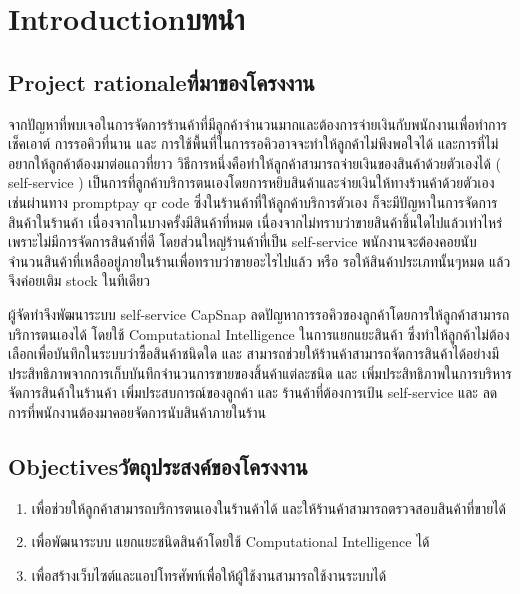 \chapter{\ifenglish Introduction\else บทนำ\fi}

\section{\ifenglish Project rationale\else ที่มาของโครงงาน\fi}
จากปัญหาที่พบเจอในการจัดการร้านค้าที่มีลูกค้าจำนวนมากและต้องการจ่ายเงินกับพนักงานเพื่อทำการเช็คเอาต์ การรอคิวที่นาน และ การใช้พื้นที่ในการรอคิวอาจจะทำให้ลูกค้าไม่พึงพอใจได้
และการที่ไม่อยากให้ลูกค้าต้องมาต่อแถวที่ยาว วิธีการหนึ่งคือทำให้ลูกค้าสามารถจ่ายเงินของสินค้าด้วยตัวเองได้ ( self-service ) เป็นการที่ลูกค้าบริการตนเองโดยการหยิบสินค้าและจ่ายเงินให้ทางร้านค้าด้วยตัวเอง  เช่นผ่านทาง promptpay qr code
ซึ่งในร้านค้าที่ให้ลูกค้าบริการตัวเอง ก็จะมีปัญหาในการจัดการสินค้าในร้านค้า เนื่องจากในบางครั้งมีสินค้าที่หมด เนื่องจากไม่ทราบว่าขายสินค้าชิ้นใดไปแล้วเท่าไหร่ เพราะไม่มีการจัดการสินค้าที่ดี
โดยส่วนใหญ่ร้านค้าที่เป็น  self-service พนักงานจะต้องคอยนับจำนวนสินค้าที่เหลืออยู่ภายในร้านเพื่อทราบว่าขายอะไรไปแล้ว  หรือ รอให้สินค้าประเภทนั้นๆหมด แล้วจึงค่อยเติม stock ในทีเดียว

ผู้จัดทําจึงพัฒนาระบบ self-service CapSnap ลดปัญหาการรอคิวของลูกค้าโดยการให้ลูกค้าสามารถบริการตนเองได้  โดยใช้ Computational Intelligence ในการแยกแยะสินค้า ซึ่งทำให้ลูกค้าไม่ต้องเลือกเพื่อบันทึกในระบบว่าซื้อสินค้าชนิดใด  และ สามารถช่วยให้ร้านค้าสามารถจัดการสินค้าได้อย่างมีประสิทธิภาพจากการเก็บบันทึกจำนวนการขายของสิ้นค้าแต่ละชนิด และ เพิ่มประสิทธิภาพในการบริหารจัดการสินค้าในร้านค้า เพิ่มประสบการณ์ของลูกค้า และ ร้านค้าที่ต้องการเป้น self-service และ ลดการที่พนักงานต้องมาคอยจัดการนับสินค้าภายในร้าน



\section{\ifenglish Objectives\else วัตถุประสงค์ของโครงงาน\fi}
\begin{enumerate}
    \item เพื่อช่วยให้ลูกค้าสามารถบริการตนเองในร้านค้าได้ และให้ร้านค้าสามารถตรวจสอบสินค้าที่ขายได้
    \item เพื่อพัฒนาระบบ แยกแยะชนิดสินค้าโดยใช้ Computational Intelligence ได้
    \item เพื่อสร้างเว็บไซต์และแอปโทรศัพท์เพื่อให้ผู้ใช้งานสามารถใช้งานระบบได้
\end{enumerate}

